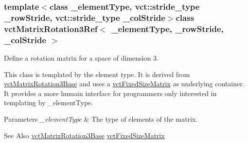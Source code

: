 \subsubsection*{template$<$class \-\_\-element\-Type, vct\-::stride\-\_\-type \-\_\-row\-Stride, vct\-::stride\-\_\-type \-\_\-col\-Stride$>$class vct\-Matrix\-Rotation3\-Ref$<$ \-\_\-element\-Type, \-\_\-row\-Stride, \-\_\-col\-Stride $>$}

Define a rotation matrix for a space of dimension 3. 

This class is templated by the element type. It is derived from \hyperlink{classvct_matrix_rotation3_base}{vct\-Matrix\-Rotation3\-Base} and uses a \hyperlink{classvct_fixed_size_matrix}{vct\-Fixed\-Size\-Matrix} as underlying container. It provides a more humain interface for programmers only interested in templating by \-\_\-element\-Type.


\begin{DoxyParams}{Parameters}
{\em \-\_\-element\-Type} & The type of elements of the matrix.\\
\hline
\end{DoxyParams}
\begin{DoxySeeAlso}{See Also}
\hyperlink{classvct_matrix_rotation3_base}{vct\-Matrix\-Rotation3\-Base} \hyperlink{classvct_fixed_size_matrix}{vct\-Fixed\-Size\-Matrix} 
\end{DoxySeeAlso}


